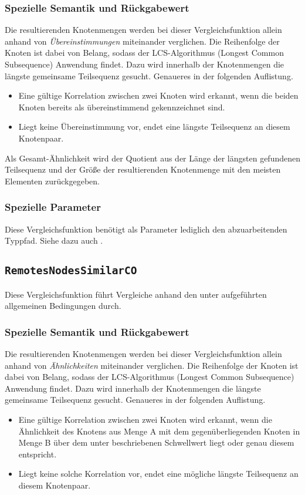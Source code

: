 \subsubsection*{Spezielle Semantik und Rückgabewert}
Die resultierenden Knotenmengen werden bei dieser Vergleichsfunktion allein anhand von \emph{Übereinstimmungen} miteinander verglichen. Die Reihenfolge der Knoten ist dabei von Belang, sodass der LCS-Algorithmus (Longest Common Subsequence) Anwendung findet. Dazu wird innerhalb der Knotenmengen die längste gemeinsame Teilsequenz gesucht. Genaueres in der folgenden Auflistung.
\begin{itemize}
	\item Eine gültige Korrelation zwischen zwei Knoten wird erkannt, wenn die beiden Knoten bereits als übereinstimmend gekennzeichnet sind.
	\item Liegt keine Übereinstimmung vor, endet eine längste Teilsequenz an diesem Knotenpaar.
\end{itemize}

Als Gesamt-Ähnlichkeit wird der Quotient aus der Länge der längsten gefundenen Teilsequenz und der Größe der resultierenden Knotenmenge mit den meisten Elementen zurückgegeben.

\subsubsection*{Spezielle Parameter}
Diese Vergleichsfunktion benötigt als Parameter lediglich den abzuarbeitenden Typpfad. Siehe dazu auch .


\newpage
%
%
\subsection{\texttt{RemotesNodesSimilarCO}}
Diese Vergleichsfunktion führt Vergleiche anhand den unter  aufgeführten allgemeinen Bedingungen durch.

\subsubsection*{Spezielle Semantik und Rückgabewert}
Die resultierenden Knotenmengen werden bei dieser Vergleichsfunktion allein anhand von \emph{Ähnlichkeiten} miteinander verglichen. Die Reihenfolge der Knoten ist dabei von Belang, sodass der LCS-Algorithmus (Longest Common Subsequence) Anwendung findet. Dazu wird innerhalb der Knotenmengen die längste gemeinsame Teilsequenz gesucht. Genaueres in der folgenden Auflistung.
\begin{itemize}
	\item Eine gültige Korrelation zwischen zwei Knoten wird erkannt, wenn die Ähnlichkeit des Knotens aus Menge A mit dem gegenüberliegenden Knoten in Menge B über dem unter  beschriebenen Schwellwert liegt oder genau diesem entspricht.
	\item Liegt keine solche Korrelation vor, endet eine mögliche längste Teilsequenz an diesem Knotenpaar.
\end{itemize}

